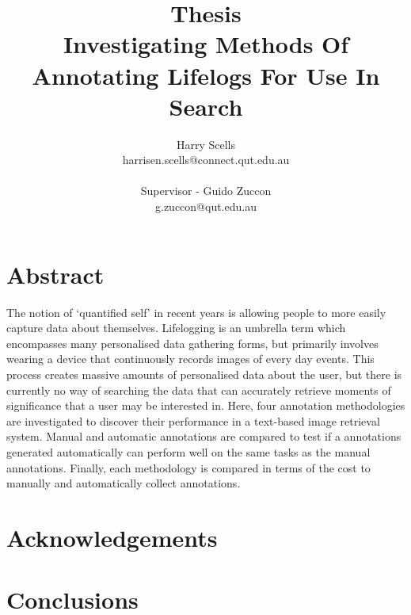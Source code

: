 \documentclass[12pt,a4paper]{book}
\begin{document}
\title{\small Thesis\\\huge Investigating Methods Of Annotating Lifelogs For Use In Search}

\author{Harry Scells\\harrisen.scells@connect.qut.edu.au\\\\\small Supervisor - Guido Zuccon\\\small g.zuccon@qut.edu.au\\}
\maketitle

\chapter*{Abstract}
The notion of `quantified self' in recent years is allowing people to more easily capture data about themselves. Lifelogging is an umbrella term which encompasses many personalised data gathering forms, but primarily involves wearing a device that continuously records images of every day events. This process creates massive amounts of personalised data about the user, but there is currently no way of searching the data that can accurately retrieve moments of significance that a user may be interested in. Here, four annotation methodologies are investigated to discover their performance in a text-based image retrieval system. Manual and automatic annotations are compared to test if a annotations generated automatically can perform well on the same tasks as the manual annotations. Finally, each methodology is compared in terms of the cost to manually and automatically collect annotations.

\chapter*{Acknowledgements}

\tableofcontents









\chapter{Conclusions}




\end{document}
